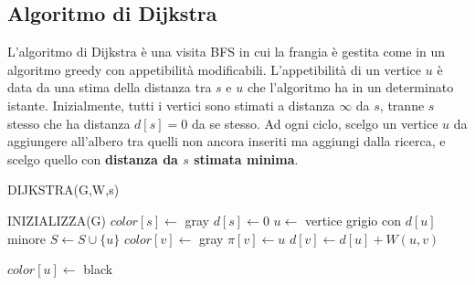 \documentclass[11pt]{article}
\begin{document}
\subsection{Algoritmo di Dijkstra}
L'algoritmo di Dijkstra è una visita BFS in cui la frangia è gestita come in un algoritmo greedy con appetibilità modificabili.
L'appetibilità di un vertice $u$ è data da una stima della distanza tra $s$ e $u$ che l'algoritmo ha in un determinato istante.
Inizialmente, tutti i vertici sono stimati a distanza $\infty$ da $s$, tranne $s$ stesso che ha distanza $d[s]=0$ da se 
stesso. Ad ogni ciclo, scelgo un vertice $u$ da aggiungere all'albero tra quelli non ancora inseriti ma aggiungi dalla 
ricerca, e scelgo quello con \textbf{distanza da $s$ stimata minima}.
\begin{algorithm}[H]
    \caption{DIJKSTRA(G,W,s)}
    \begin{algorithmic}
        \State INIZIALIZZA(G)
        \State $color[s]\gets$ gray
        \State $d[s]\gets 0$
            \State $u\gets$ vertice grigio con $d[u]$ minore
            \State $S\gets S\cup\{u\}$
                    \State $color[v]\gets$ gray 
                        \State $\pi[v]\gets u$
                        \State $d[v]\gets d[u]+W(u,v)$
                    \EndIf
                \EndIf 
            \EndFor 
    \end{algorithmic}
\end{algorithm}
\begin{algorithm}[t]
    \begin{algorithmic}
            \State $color[u]\gets$ black
        \EndWhile
    \end{algorithmic}
\end{algorithm}
\end{document}
